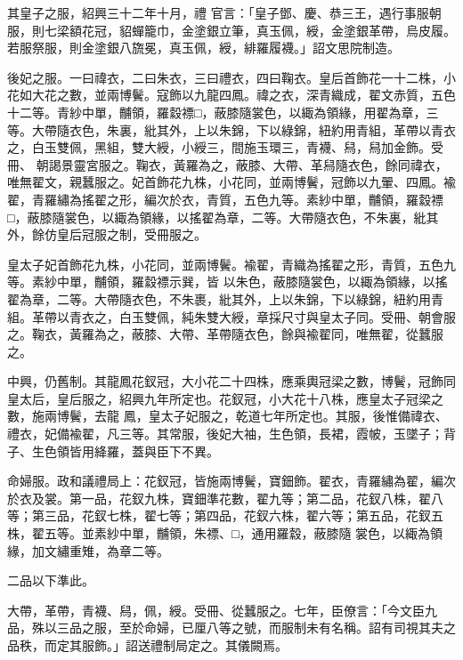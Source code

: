 \begin{pinyinscope}
 其皇子之服，紹興三十二年十月，禮
 官言：「皇子鄧、慶、恭三王，遇行事服朝服，則七梁額花冠，貂蟬籠巾，金塗銀立筆，真玉佩，綬，金塗銀革帶，烏皮履。若服祭服，則金塗銀八旒冕，真玉佩，綬，緋羅履襪。」詔文思院制造。



 後妃之服。一曰禕衣，二曰朱衣，三曰禮衣，四曰鞠衣。皇后首飾花一十二株，小花如大花之數，並兩博鬢。寇飾以九龍四鳳。禕之衣，深青織成，翟文赤質，五色十二等。青紗中單，黼領，羅縠褾□，蔽膝隨裳色，以緅為領緣，用翟為章，三等。大帶隨衣色，朱裏，紕其外，上以朱錦，下以綠錦，紐約用青組，革帶以青衣之，白玉雙佩，黑組，雙大綬，小綬三，間施玉環三，青襪、舄，舄加金飾。受冊、
 朝謁景靈宮服之。鞠衣，黃羅為之，蔽膝、大帶、革舄隨衣色，餘同禕衣，唯無翟文，親蠶服之。妃首飾花九株，小花同，並兩博鬢，冠飾以九翬、四鳳。褕翟，青羅繡為搖翟之形，編次於衣，青質，五色九等。素紗中單，黼領，羅縠褾□，蔽膝隨裳色，以緅為領緣，以搖翟為章，二等。大帶隨衣色，不朱裏，紕其外，餘仿皇后冠服之制，受冊服之。



 皇太子妃首飾花九株，小花同，並兩博鬢。褕翟，青織為搖翟之形，青質，五色九等。素紗中單，黼領，羅縠褾示巽，皆
 以朱色，蔽膝隨裳色，以緅為領緣，以搖翟為章，二等。大帶隨衣色，不朱裹，紕其外，上以朱錦，下以綠錦，紐約用青組。革帶以青衣之，白玉雙佩，純朱雙大綬，章採尺寸與皇太子同。受冊、朝會服之。鞠衣，黃羅為之，蔽膝、大帶、革帶隨衣色，餘與褕翟同，唯無翟，從蠶服之。



 中興，仍舊制。其龍鳳花釵冠，大小花二十四株，應乘輿冠梁之數，博鬢，冠飾同皇太后，皇后服之，紹興九年所定也。花釵冠，小大花十八株，應皇太子冠梁之數，施兩博鬢，去龍
 鳳，皇太子妃服之，乾道七年所定也。其服，後惟備禕衣、禮衣，妃備褕翟，凡三等。其常服，後妃大袖，生色領，長裙，霞帔，玉墜子；背子、生色領皆用絳羅，蓋與臣下不異。



 命婦服。政和議禮局上：花釵冠，皆施兩博鬢，寶鈿飾。翟衣，青羅繡為翟，編次於衣及裳。第一品，花釵九株，寶鈿準花數，翟九等；第二品，花釵八株，翟八等；第三品，花釵七株，翟七等；第四品，花釵六株，翟六等；第五品，花釵五株，翟五等。並素紗中單，黼領，朱褾、□，通用羅縠，蔽膝隨
 裳色，以緅為領緣，加文繡重雉，為章二等。



 二品以下準此。



 大帶，革帶，青襪、舄，佩，綬。受冊、從蠶服之。七年，臣僚言：「今文臣九品，殊以三品之服，至於命婦，已厘八等之號，而服制未有名稱。詔有司視其夫之品秩，而定其服飾。」詔送禮制局定之。其儀闕焉。



\end{pinyinscope}